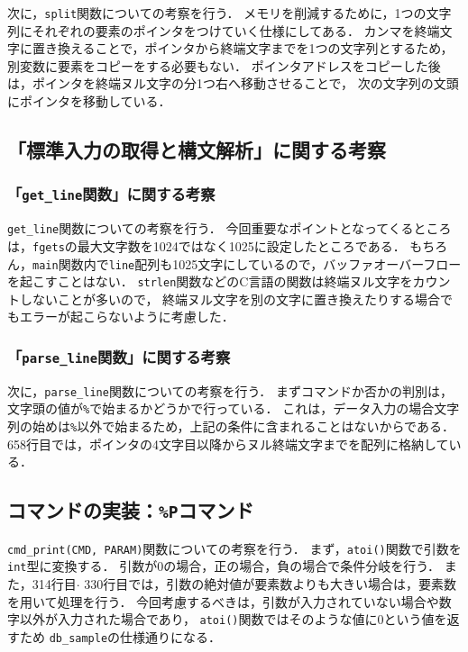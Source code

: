 \documentclass[autodetect-engine,dvi=dvipdfmx,ja=standard,
               a4j,11pt]{bxjsarticle}
\begin{document}
次に，\verb|split|関数についての考察を行う．
メモリを削減するために，1つの文字列にそれぞれの要素のポインタをつけていく仕様にしてある．
カンマを終端文字に置き換えることで，ポインタから終端文字までを1つの文字列とするため，
別変数に要素をコピーをする必要もない．
ポインタアドレスをコピーした後は，ポインタを終端ヌル文字の分1つ右へ移動させることで，
次の文字列の文頭にポインタを移動している．

\subsection{「標準入力の取得と構文解析」に関する考察}

\subsubsection{「\texttt{get\_line}関数」に関する考察}

\verb|get_line|関数についての考察を行う．
今回重要なポイントとなってくるところは，\verb|fgets|の最大文字数を1024ではなく1025に設定したところである．
もちろん，\verb|main|関数内で\verb|line|配列も1025文字にしているので，バッファオーバーフローを起こすことはない．
\verb|strlen|関数などのC言語の関数は終端ヌル文字をカウントしないことが多いので，
終端ヌル文字を別の文字に置き換えたりする場合でもエラーが起こらないように考慮した．

\subsubsection{「\texttt{parse\_line}関数」に関する考察}

次に，\verb|parse_line|関数についての考察を行う．
まずコマンドか否かの判別は，文字頭の値が\verb|%|で始まるかどうかで行っている．
これは，データ入力の場合文字列の始めは\verb|%|以外で始まるため，上記の条件に含まれることはないからである．
658行目では，ポインタの4文字目以降からヌル終端文字までを配列に格納している．

\subsection{コマンドの実装：\texttt{\%P}コマンド}

\verb|cmd_print(CMD, PARAM)|関数についての考察を行う．
まず，\verb|atoi()|関数で引数を\verb|int|型に変換する．
引数が0の場合，正の場合，負の場合で条件分岐を行う．
また，314行目$\cdot$ 330行目では，引数の絶対値が要素数よりも大きい場合は，要素数を用いて処理を行う．
今回考慮するべきは，引数が入力されていない場合や数字以外が入力された場合であり，
\verb|atoi()|関数ではそのような値に$0$という値を返すため
\verb|db_sample|の仕様通りになる．
\end{document}
